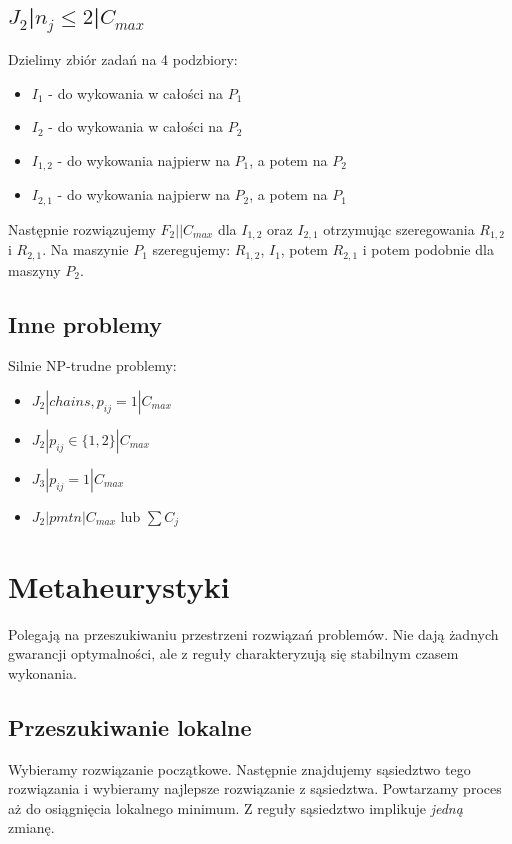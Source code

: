 \documentclass{../notatki}
\begin{document}
\subsection{\texorpdfstring{$J_2$|$n_j \leq 2$|$C_{max}$}{J2|nj<=2|Cmax}}

Dzielimy zbiór zadań na 4 podzbiory:
\begin{itemize}
  \item $I_1$ - do wykowania w całości na $P_1$
  \item $I_2$ - do wykowania w całości na $P_2$
  \item $I_{1,2}$ - do wykowania najpierw na $P_1$, a potem na $P_2$
  \item $I_{2,1}$ - do wykowania najpierw na $P_2$, a potem na $P_1$
\end{itemize}
Następnie rozwiązujemy $F_2||C_{max}$ dla $I_{1,2}$ oraz $I_{2,1}$ otrzymując
szeregowania $R_{1,2}$ i $R_{2,1}$.
Na maszynie $P_1$ szeregujemy: $R_{1,2}$, $I_1$, potem $R_{2,1}$ i potem
podobnie dla maszyny $P_2$.

\subsection{Inne problemy}

Silnie NP-trudne problemy:
\begin{itemize}
  \item $J_2|chains, p_{ij} = 1|C_{max}$
  \item $J_2|p_{ij} \in \{1, 2\}|C_{max}$
  \item $J_3|p_{ij} = 1|C_{max}$
  \item $J_2|pmtn|C_{max} \text{ lub } \sum C_j$
\end{itemize}

\section{Metaheurystyki}

Polegają na przeszukiwaniu przestrzeni rozwiązań problemów. Nie dają żadnych
gwarancji optymalności, ale z reguły charakteryzują się stabilnym
czasem wykonania.

\subsection{Przeszukiwanie lokalne}

Wybieramy rozwiązanie początkowe. Następnie znajdujemy sąsiedztwo
tego rozwiązania
i wybieramy najlepsze rozwiązanie z sąsiedztwa. Powtarzamy proces aż
do osiągnięcia
lokalnego minimum. Z reguły sąsiedztwo implikuje \textit{jedną} zmianę.
\end{document}
